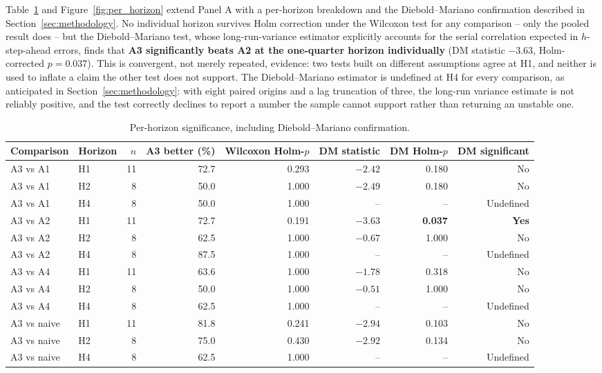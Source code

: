 \documentclass[preprint,12pt]{elsarticle}
\begin{document}
Table~\ref{tab:dm} and Figure~\ref{fig:per_horizon} extend Panel A with a per-horizon breakdown and the Diebold--Mariano confirmation described in Section~\ref{sec:methodology}. No individual horizon survives Holm correction under the Wilcoxon test for any comparison -- only the pooled result does -- but the Diebold--Mariano test, whose long-run-variance estimator explicitly accounts for the serial correlation expected in $h$-step-ahead errors, finds that \textbf{A3 significantly beats A2 at the one-quarter horizon individually} (DM statistic $-3.63$, Holm-corrected $p=0.037$). This is convergent, not merely repeated, evidence: two tests built on different assumptions agree at H1, and neither is used to inflate a claim the other test does not support. The Diebold--Mariano estimator is undefined at H4 for every comparison, as anticipated in Section~\ref{sec:methodology}: with eight paired origins and a lag truncation of three, the long-run variance estimate is not reliably positive, and the test correctly declines to report a number the sample cannot support rather than returning an unstable one.

\begin{table}[!htbp]
\centering
\caption{Per-horizon significance, including Diebold--Mariano confirmation.}
\label{tab:dm}
\scriptsize
\begin{adjustbox}{max width=\textwidth}
\begin{tabular}{@{}llrrrrrr@{}}
\toprule
Comparison & Horizon & $n$ & A3 better (\%) & Wilcoxon Holm-$p$ & DM statistic & DM Holm-$p$ & DM significant \\
\midrule
A3 vs A1 & H1 & 11 & 72.7 & 0.293 & $-2.42$ & 0.180 & No \\
A3 vs A1 & H2 & 8 & 50.0 & 1.000 & $-2.49$ & 0.180 & No \\
A3 vs A1 & H4 & 8 & 50.0 & 1.000 & -- & -- & Undefined \\
A3 vs A2 & H1 & 11 & 72.7 & 0.191 & $-3.63$ & \textbf{0.037} & \textbf{Yes} \\
A3 vs A2 & H2 & 8 & 62.5 & 1.000 & $-0.67$ & 1.000 & No \\
A3 vs A2 & H4 & 8 & 87.5 & 1.000 & -- & -- & Undefined \\
A3 vs A4 & H1 & 11 & 63.6 & 1.000 & $-1.78$ & 0.318 & No \\
A3 vs A4 & H2 & 8 & 50.0 & 1.000 & $-0.51$ & 1.000 & No \\
A3 vs A4 & H4 & 8 & 62.5 & 1.000 & -- & -- & Undefined \\
A3 vs naive & H1 & 11 & 81.8 & 0.241 & $-2.94$ & 0.103 & No \\
A3 vs naive & H2 & 8 & 75.0 & 0.430 & $-2.92$ & 0.134 & No \\
A3 vs naive & H4 & 8 & 62.5 & 1.000 & -- & -- & Undefined \\
\bottomrule
\end{tabular}
\end{adjustbox}
\end{table}
\end{document}
